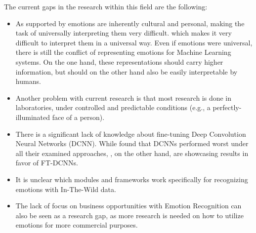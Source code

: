 The current gaps in the research within this field are the following:\newline
\begin{itemize}
    \item As supported by \citet{Salah:2018:VideoBasedER} emotions are inherently cultural and personal, making the task of universally interpreting them very difficult. which makes it very difficult to interpret them in a universal way. Even if emotions were universal, there is still the conflict of representing emotions for Machine Learning systems. On the one hand, these representations should carry higher information, but should on the other hand also be easily interpretable by humans.
    \item Another problem with current research is that most research is done in laboratories, under controlled and predictable conditions (e.g., a perfectly-illuminated face of a person).
    \item There is a significant lack of knowledge about fine-tuning Deep Convolution Neural Networks (DCNN). While \citet{Kossaifi:2017:AFEW-VADatabase} found that DCNNs performed worst under all their examined approaches, \citet{Handrich:2020:SimultaneousPredVA}, on the other hand, are showcasing results in favor of FT-DCNNs.
    \item It is unclear which modules and frameworks work specifically for recognizing emotions with In-The-Wild data.
    \item The lack of focus on business opportunities with Emotion Recognition can also be seen as a research gap, as more research is needed on how to utilize emotions for more commercial purposes.
\end{itemize}

